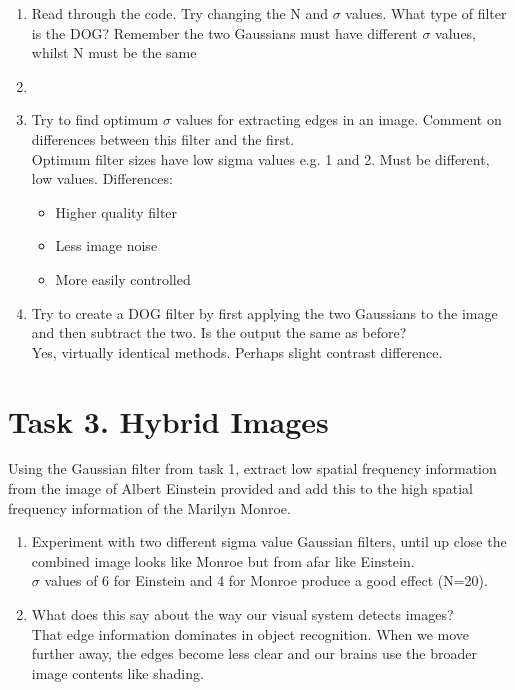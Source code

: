 \documentclass[12pt,english]{scrartcl}
\begin{document}
\begin{enumerate}
 \color{black}
 \item  Read through the code. Try changing the N and $\sigma$ values. What type of filter is the DOG? Remember the two Gaussians must have different $\sigma$ values, whilst N must be the same\\ 
 \item[]
 
 \color{black}
 \item Try to find optimum $\sigma$ values for extracting edges in an image. Comment on differences between this filter and the first.\\
 \color{blue}
 Optimum filter sizes have low sigma values e.g. 1 and 2. Must be different, low values.
 \color{blue}
 Differences:
 \begin{itemize}
 \item Higher quality filter 
 \item Less image noise
 \item More easily controlled
 \end{itemize}
 
 \color{black}
 \item Try to create a DOG filter by first applying the two Gaussians to the image and then subtract the two. Is the output the same as before? \\
 \color{blue}
 Yes, virtually identical methods. Perhaps slight contrast difference.
\end{enumerate}
 

\section*{Task 3. Hybrid Images}
Using the Gaussian filter from task 1, extract low spatial frequency information from the image of Albert Einstein provided and add this to the high spatial frequency information of the Marilyn Monroe. \\
\begin{enumerate}
\item Experiment with two different sigma value Gaussian filters, until up close the combined image looks like Monroe but from afar like Einstein. \\
\color{blue} 
$\sigma$ values of 6 for Einstein and 4 for Monroe produce a good effect (N=20). \\
\color{black}
\item What does this say about the way our visual system detects images? \\
\color{blue}
That edge information dominates in object recognition. When we move further away, the edges become less clear and our brains use the broader image contents like shading. \\
\end{enumerate}
\end{document}
